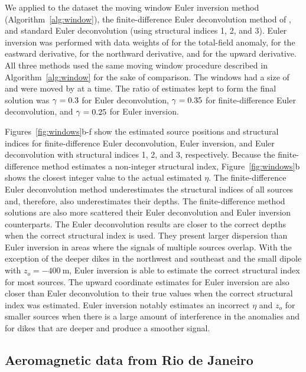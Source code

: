 We applied to the dataset the moving window Euler inversion method (Algorithm~\ref{alg:window}), the finite-difference Euler deconvolution method of \citet{Gerovska2005}, and standard Euler deconvolution (using structural indices 1, 2, and 3).
Euler inversion was performed with data weights of \DefaultWeightsF{} for the total-field anomaly, \DefaultWeightsE{} for the eastward derivative, \DefaultWeightsN{} for the northward derivative, and \DefaultWeightsU{} for the upward derivative.
All three methods used the same moving window procedure described in Algorithm~\ref{alg:window} for the sake of comparison.
The windows had a size of \SynWinWindowSize{} and were moved by \SynWinWindowStep{} at a time.
The ratio of estimates kept to form the final solution was $\gamma=0.3$ for Euler deconvolution, $\gamma=0.35$ for finite-difference Euler deconvolution, and $\gamma=0.25$ for Euler inversion.

Figures~\ref{fig:windows}b-f show the estimated source positions and structural indices for finite-difference Euler deconvolution, Euler inversion, and Euler deconvolution with structural indices 1, 2, and 3, respectively.
Because the finite-difference method estimates a non-integer structural index, Figure~\ref{fig:windows}b shows the closest integer value to the actual estimated $\eta$.
The finite-difference Euler deconvolution method underestimates the structural indices of all sources and, therefore, also underestimates their depths.
The finite-difference method solutions are also more scattered their Euler deconvolution and Euler inversion counterparts.
The Euler deconvolution results are closer to the correct depths when the correct structural index is used.
They present larger dispersion than Euler inversion in areas where the signals of multiple sources overlap.
With the exception of the deeper dikes in the northwest and southeast and the small dipole with $z_o=\qty{-400}{\m}$, Euler inversion is able to estimate the correct structural index for most sources.
The upward coordinate estimates for Euler inversion are also closer than Euler deconvolution to their true values when the correct structural index was estimated.
Euler inversion notably estimates an incorrect $\eta$ and $z_o$ for smaller sources when there is a large amount of interference in the anomalies and for dikes that are deeper and produce a smoother signal.


\subsection{Aeromagnetic data from Rio de Janeiro}
\label{sec:rio}

